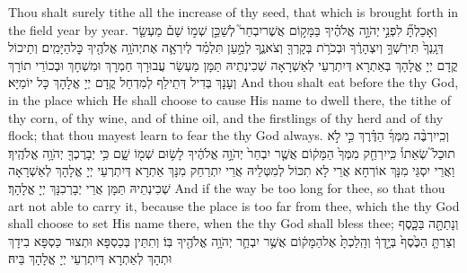 {Thou shalt surely tithe all the increase of thy seed, that which is brought forth in the field year by year.}{}
{וְאָכַלְתָּ֞ לִפְנֵ֣י \legarmeh  יְהֹוָ֣ה אֱלֹהֶ֗יךָ בַּמָּק֣וֹם אֲשֶׁר\maqqaf יִבְחַר֮ לְשַׁכֵּ֣ן שְׁמ֣וֹ שָׁם֒ מַעְשַׂ֤ר דְּגָֽנְךָ֙ תִּירֹֽשְׁךָ֣ וְיִצְהָרֶ֔ךָ וּבְכֹרֹ֥ת בְּקָרְךָ֖ וְצֹאנֶ֑ךָ לְמַ֣עַן תִּלְמַ֗ד לְיִרְאָ֛ה אֶת\maqqaf יְהֹוָ֥ה אֱלֹהֶ֖יךָ כׇּל\maqqaf הַיָּמִֽים׃}
{וְתֵיכוֹל קֳדָם יְיָ אֱלָהָךְ בְּאַתְרָא דְּיִתְרְעֵי לְאַשְׁרָאָה שְׁכִינְתֵיהּ תַּמָּן מַעְשַׂר עֲבוּרָךְ חַמְרָךְ וּמִשְׁחָךְ וּבְכוֹרֵי תוֹרָךְ וְעָנָךְ בְּדִיל דְּתֵילַף לְמִדְחַל קֳדָם יְיָ אֱלָהָךְ כָּל יוֹמַיָּא׃}
{And thou shalt eat before the \lord\space thy God, in the place which He shall choose to cause His name to dwell there, the tithe of thy corn, of thy wine, and of thine oil, and the firstlings of thy herd and of thy flock; that thou mayest learn to fear the \lord\space thy God always.}{}
{וְכִֽי\maqqaf יִרְבֶּ֨ה מִמְּךָ֜ הַדֶּ֗רֶךְ כִּ֣י לֹ֣א תוּכַל֮ שְׂאֵתוֹ֒ כִּֽי\maqqaf יִרְחַ֤ק מִמְּךָ֙ הַמָּק֔וֹם אֲשֶׁ֤ר יִבְחַר֙ יְהֹוָ֣ה אֱלֹהֶ֔יךָ לָשׂ֥וּם שְׁמ֖וֹ שָׁ֑ם כִּ֥י יְבָרֶכְךָ֖ יְהֹוָ֥ה אֱלֹהֶֽיךָ׃}
{וַאֲרֵי יִסְגֵּי מִנָּךְ אוֹרְחָא אֲרֵי לָא תִכּוֹל לְמִטְּלֵיהּ אֲרֵי יִתְרַחַק מִנָּךְ אַתְרָא דְּיִתְרְעֵי יְיָ אֱלָהָךְ לְאַשְׁרָאָה שְׁכִינְתֵיהּ תַּמָּן אֲרֵי יְבָרְכִנָּךְ יְיָ אֱלָהָךְ׃}
{And if the way be too long for thee, so that thou art not able to carry it, because the place is too far from thee, which the \lord\space thy God shall choose to set His name there, when the \lord\space thy God shall bless thee;}{}
{וְנָתַתָּ֖ה בַּכָּ֑סֶף וְצַרְתָּ֤ הַכֶּ֙סֶף֙ בְּיָ֣דְךָ֔ וְהָֽלַכְתָּ֙ אֶל\maqqaf הַמָּק֔וֹם אֲשֶׁ֥ר יִבְחַ֛ר יְהֹוָ֥ה אֱלֹהֶ֖יךָ בּֽוֹ׃}
{וְתִתֵּין בְּכַסְפָּא וּתְצוּר כַּסְפָּא בִידָךְ וּתְהָךְ לְאַתְרָא דְּיִתְרְעֵי יְיָ אֱלָהָךְ בֵּיהּ׃}
